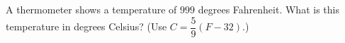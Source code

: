 A thermometer shows a temperature of $999$ degrees Fahrenheit. What is this temperature in degrees Celsius? (Use $C=\dfrac59(F-32)$.)
